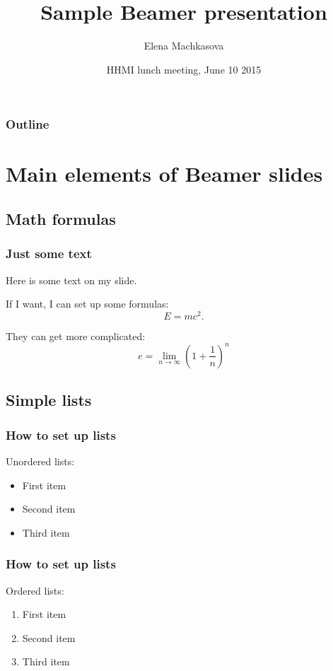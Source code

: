 \documentclass{beamer}
\begin{document}
\title{Sample Beamer presentation}
\author{Elena Machkasova}
\date[]  
{HHMI lunch meeting, June 10 2015}

\begin{frame}
  \titlepage
\end{frame}

\begin{frame}

  \frametitle{Outline}
\tableofcontents
\end{frame}

\section{Main elements of Beamer slides}

\subsection{Math formulas}

\begin{frame}
  \frametitle{Just some text}
Here is some text on my slide. 

If I want, I can set up some formulas:
$$
E = mc^2.
$$

They can get more complicated:
\[
e = \lim_{n \to \infty} {\left( 1 + \frac{1}{n} \right)}^n
\]
\end{frame}

\subsection{Simple lists}

\begin{frame}
  \frametitle{How to set up lists}
Unordered lists:
\begin{itemize}
\item First item 
\item Second item
\item Third item
\end{itemize}
\end{frame}

\begin{frame}
  \frametitle{How to set up lists}
Ordered lists:
\begin{enumerate}
\item First item 
\item Second item
\item Third item
\end{enumerate}
\end{frame}
\end{document}
